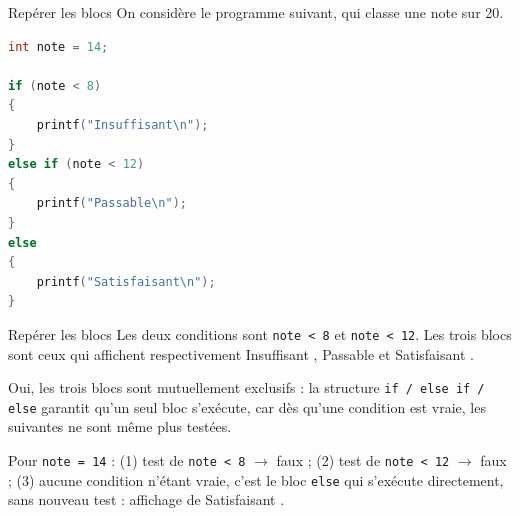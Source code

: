 \begin{UPSTIexercice}{Repérer les blocs}
    On considère le programme suivant, qui classe une note sur 20.
    \begin{lstlisting}[language=C]
int note = 14;

if (note < 8)
{
    printf("Insuffisant\n");
}
else if (note < 12)
{
    printf("Passable\n");
}
else
{
    printf("Satisfaisant\n");
}
    \end{lstlisting}
\end{UPSTIexercice}

\begin{UPSTIprofOnlyEnv}
    \begin{UPSTIcorrectionP}{Repérer les blocs}
        Les deux conditions sont \texttt{note < 8} et \texttt{note < 12}. Les trois blocs sont ceux qui affichent respectivement \og Insuffisant \fg, \og Passable \fg{} et \og Satisfaisant \fg.

        Oui, les trois blocs sont mutuellement exclusifs : la structure \texttt{if / else if / else} garantit qu'un seul bloc s'exécute, car dès qu'une condition est vraie, les suivantes ne sont même plus testées.

        Pour \texttt{note = 14} : (1) test de \texttt{note < 8} $\to$ faux ; (2) test de \texttt{note < 12} $\to$ faux ; (3) aucune condition n'étant vraie, c'est le bloc \texttt{else} qui s'exécute directement, sans nouveau test : affichage de \og Satisfaisant \fg.
    \end{UPSTIcorrectionP}
\end{UPSTIprofOnlyEnv}


